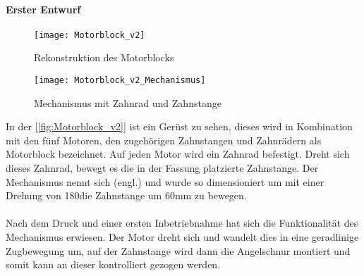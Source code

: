\documentclass[titlepage,12pt,twoside]{article}
\begin{document}
\paragraph{Erster Entwurf}
\hfill \break
\hfill \break
\begin{figure}[H]
	\begin{center}
		\scalebox{0.8}
		{\texttt{[image: Motorblock\_v2]}}
		\caption{Rekonstruktion des Motorblocks}
		\label{fig:Motorblock_v2}			
	\end{center}
\end{figure}
\begin{figure}[H]
	\begin{center}
		\scalebox{0.8}
		{\texttt{[image: Motorblock\_v2\_Mechanismus]}}
		\caption{Mechanismus mit Zahnrad und Zahnstange}
		\label{fig:Motorblock_v22}			
	\end{center}
\end{figure}
\hfill \break
In der [\textcolor{blue}{\autoref{fig:Motorblock_v2}}] ist ein Gerüst zu sehen, dieses wird in Kombination mit den fünf Motoren, den zugehörigen Zahnstangen und Zahnrädern als Motorblock bezeichnet. Auf jeden Motor wird ein Zahnrad befestigt. Dreht sich dieses Zahnrad, bewegt es die 
in der Fassung platzierte Zahnstange. Der Mechanismus nennt sich  (engl.) und wurde so dimensioniert um mit einer Drehung von 180\textdegree die Zahnstange um 60mm zu bewegen. \\
\\
Nach dem Druck und einer ersten Inbetriebnahme hat sich die Funktionalität des Mechanismus erwiesen. Der Motor dreht sich und wandelt dies in eine geradlinige Zugbewegung um, auf der Zahnstange wird dann die Angelschnur montiert und somit kann an 
dieser kontrolliert gezogen werden. \\
\\
\newpage
\end{document}
